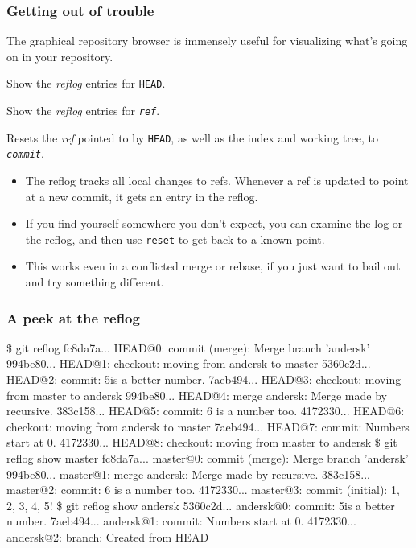 \documentclass{beamer}
\makeatletter
\newcommand{\sh}[1]{\$ {\color{beamer@blendedblue}#1}}
\makeatother
\begin{document}
\begin{frame}
  \frametitle{Getting out of trouble}
  \begin{description}
  \item[\texttt{gitk HEAD --all}\hfill] The graphical repository browser is
    immensely useful for visualizing what's going on in your
    repository.
  \item[\texttt{git reflog}\hfill] Show the \emph{reflog} entries for
    \texttt{HEAD}.
  \item[\texttt{git reflog show \textit{ref}}\hfill] Show the
    \emph{reflog} entries for \texttt{\textit{ref}}.
  \item[\texttt{git reset --hard \textit{commit}}\hfill] Resets the
    \emph{ref} pointed to by \texttt{HEAD}, as well as the index and
    working tree, to \texttt{\textit{commit}}.
  \end{description}

  \begin{itemize}
  \item The reflog tracks all local changes to refs.  Whenever a ref
    is updated to point at a new commit, it gets an entry in the
    reflog.
  \item If you find yourself somewhere you don't expect, you can
    examine the log or the reflog, and then use \texttt{reset} to get
    back to a known point.
  \item This works even in a conflicted merge or rebase, if you just
    want to bail out and try something different.
  \end{itemize}

\end{frame}

\begin{frame}[fragile]
  \frametitle{A peek at the reflog}
  {\footnotesize
  \begin{semiverbatim}
\sh{git reflog}
{\color{olive}fc8da7a...} HEAD@{0}: commit (merge): Merge branch 'andersk'
{\color{olive}994be80...} HEAD@{1}: checkout: moving from andersk to master
{\color{olive}5360c2d...} HEAD@{2}: commit: 5\textonehalf is a better number.
{\color{olive}7aeb494...} HEAD@{3}: checkout: moving from master to andersk
{\color{olive}994be80...} HEAD@{4}: merge andersk: Merge made by recursive.
{\color{olive}383c158...} HEAD@{5}: commit: 6 is a number too.
{\color{olive}4172330...} HEAD@{6}: checkout: moving from andersk to master
{\color{olive}7aeb494...} HEAD@{7}: commit: Numbers start at 0.
{\color{olive}4172330...} HEAD@{8}: checkout: moving from master to andersk
\sh{git reflog show master}
{\color{olive}fc8da7a...} master@{0}: commit (merge): Merge branch 'andersk'
{\color{olive}994be80...} master@{1}: merge andersk: Merge made by recursive.
{\color{olive}383c158...} master@{2}: commit: 6 is a number too.
{\color{olive}4172330...} master@{3}: commit (initial): 1, 2, 3, 4, 5!
\sh{git reflog show andersk}
{\color{olive}5360c2d...} andersk@{0}: commit: 5\textonehalf is a better number.
{\color{olive}7aeb494...} andersk@{1}: commit: Numbers start at 0.
{\color{olive}4172330...} andersk@{2}: branch: Created from HEAD
  \end{semiverbatim}}
\end{frame}
\end{document}
